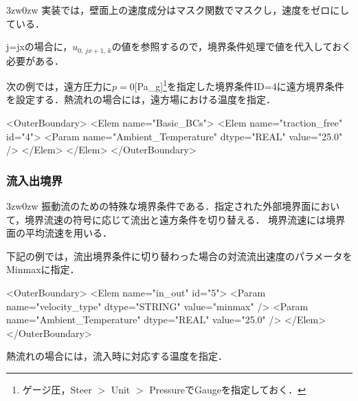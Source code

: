 \begin{indentation}{3zw}{0zw}
実装では，壁面上の速度成分はマスク関数でマスクし，速度をゼロにしている．

j=jxの場合に，$u_{0,\,jx+1,\,k}$の値を参照するので，境界条件処理で値を代入しておく必要がある．

次の例では，遠方圧力に$p=0$[Pa\_g]\footnote{ゲージ圧，Steer $>$ Unit $>$ PressureでGaugeを指定しておく．}を指定した境界条件ID=4に遠方境界条件を設定する．熱流れの場合には，遠方場における温度を指定．
{ \small
\begin{program}
<OuterBoundary>
  <Elem name="Basic_BCs">
    <Elem name="traction_free" id="4">
      <Param name="Ambient_Temperature" dtype="REAL" value="25.0" />
    </Elem>
  </Elem>
</OuterBoundary>
\end{program}
}
\end{indentation}


\pagebreak
%
\subsubsection{流入出境界}
\label{sec:BC in_out}

\begin{indentation}{3zw}{0zw}
振動流のための特殊な境界条件である．指定された外部境界面において，境界流速の符号に応じて流出と遠方条件を切り替える．
境界流速には境界面の平均流速を用いる．

下記の例では，流出境界条件に切り替わった場合の対流流出速度のパラメータをMinmaxに指定．

{\small
\begin{program}
<OuterBoundary>
  <Elem name="in_out" id="5">
    <Param name="velocity_type" dtype="STRING" value="minmax" />
    <Param name="Ambient_Temperature" dtype="REAL" value="25.0" />
  </Elem>
</OuterBoundary>
\end{program}
}

熱流れの場合には，流入時に対応する温度を指定．

\end{indentation}

\pagebreak
%
